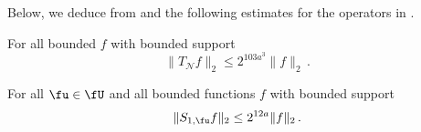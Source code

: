 Below, we deduce  from  and the following estimates for the operators in .

\begin{lemma}
    \label{nontangential-operator-bound}
    For all bounded $f$ with bounded support
    $$
        \|T_{\mathcal{N}} f\|_2 \le 2^{103a^3} \|f\|_2\,.
    $$
\end{lemma}

\begin{lemma}
    \label{boundary-operator-bound}
    For all $\fu \in \fU$ and all bounded functions $f$ with bounded support
    \begin{equation}
        \label{eq-S-bound}
        \|S_{1,\fu}f\|_2 \le 2^{12a} \|f\|_2\,.
    \end{equation}
\end{lemma}

